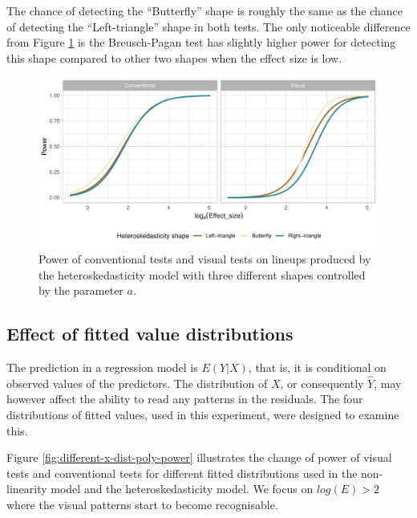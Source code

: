 \documentclass[]{interact}
\theoremstyle{plain}%
\theoremstyle{definition}
\theoremstyle{remark}
\begin{document}
The chance of detecting the ``Butterfly'' shape is roughly the same as
the chance of detecting the ``Left-triangle'' shape in both tests. The
only noticeable difference from Figure \ref{fig:heter-power-uniform-a}
is the Breusch-Pagan test has slightly higher power for detecting this
shape compared to other two shapes when the effect size is low.

\begin{figure}

{\centering \includegraphics[width=1\linewidth]{paper_comparison_files/figure-latex/heter-power-uniform-a-1} 

}

\caption{Power of conventional tests and visual tests on lineups produced by the heteroskedasticity model with three different shapes controlled by the parameter $a$.}\label{fig:heter-power-uniform-a}
\end{figure}

\hypertarget{effect-of-fitted-value-distributions}{%
\subsection{Effect of fitted value
distributions}\label{effect-of-fitted-value-distributions}}

The prediction in a regression model is \(E(Y|X)\), that is, it is
conditional on observed values of the predictors. The distribution of
\(X\), or consequently \(\hat{Y}\), may however affect the ability to
read any patterns in the residuals. The four distributions of fitted
values, used in this experiment, were designed to examine this.

Figure \ref{fig:different-x-dist-poly-power} illustrates the change of
power of visual tests and conventional tests for different fitted
distributions used in the non-linearity model and the heteroskedasticity
model. We focus on \(log(E) > 2\) where the visual patterns start to
become recognisable.
\end{document}
